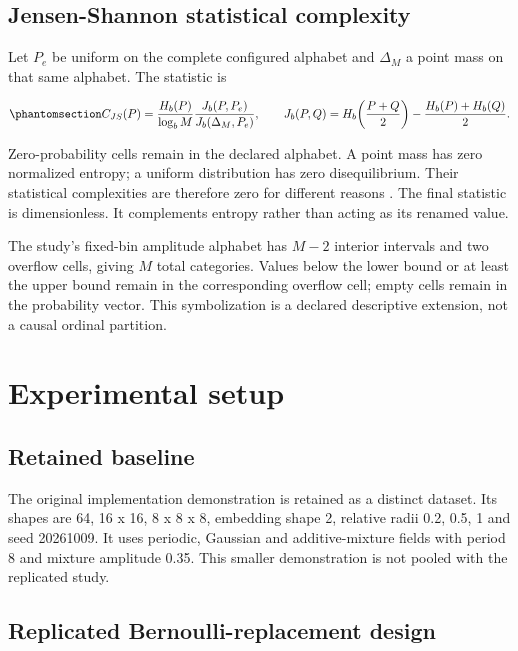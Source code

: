 \documentclass[
  english,
  11pt,
]{article}
\begin{document}
\subsection{Jensen-Shannon statistical
complexity}\label{jensen-shannon-statistical-complexity}

Let \(P_e\) be uniform on the complete configured alphabet and
\(\Delta_M\) a point mass on that same alphabet. The statistic is

\begin{equation}\protect\phantomsection\label{eq:statistical}{
C_{JS}(P)=\frac{H_b(P)}{\log_b M}
\frac{J_b(P,P_e)}{J_b(\Delta_M,P_e)},\qquad
J_b(P,Q)=H_b\!\left(\frac{P+Q}{2}\right)-\frac{H_b(P)+H_b(Q)}{2}.
}\end{equation}

Zero-probability cells remain in the declared alphabet. A point mass has
zero normalized entropy; a uniform distribution has zero disequilibrium.
Their statistical complexities are therefore zero for different reasons
\citep{rosso2007, martin2006}. The final statistic is dimensionless. It
complements entropy rather than acting as its renamed value.

The study's fixed-bin amplitude alphabet has \(M-2\) interior intervals
and two overflow cells, giving \(M\) total categories. Values below the
lower bound or at least the upper bound remain in the corresponding
overflow cell; empty cells remain in the probability vector. This
symbolization is a declared descriptive extension, not a causal ordinal
partition.

\section{Experimental setup}\label{sec:experiments}

\subsection{Retained baseline}\label{retained-baseline}

The original implementation demonstration is retained as a distinct
dataset. Its shapes are 64, 16 x 16, 8 x 8 x 8, embedding shape 2,
relative radii 0.2, 0.5, 1 and seed 20261009. It uses periodic, Gaussian
and additive-mixture fields with period 8 and mixture amplitude 0.35.
This smaller demonstration is not pooled with the replicated study.

\subsection{Replicated Bernoulli-replacement
design}\label{replicated-bernoulli-replacement-design}
\end{document}

